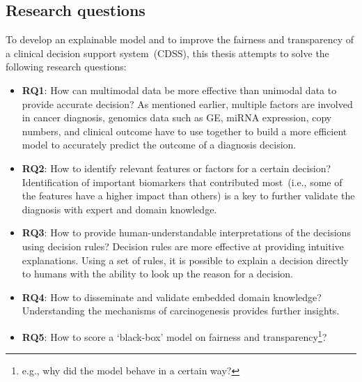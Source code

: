 \subsection{Research questions}
To develop an explainable model and to improve the fairness and transparency of a clinical decision support system~(CDSS), this thesis attempts to solve the following research questions: 

\vspace{-2mm}
\begin{itemize}[noitemsep]
    \item \textbf{RQ1}: How can multimodal data be more effective than unimodal data to provide accurate decision? As mentioned earlier, multiple factors are involved in cancer diagnosis, genomics data such as GE, miRNA expression, copy numbers, and clinical outcome have to use together to build a more efficient model to accurately predict the outcome of a diagnosis decision.  
    \item \textbf{RQ2}: How to identify relevant features or factors for a certain decision? Identification of important biomarkers that contributed most~(i.e., some of the features have a higher impact than others) is a key to further validate the diagnosis with expert and domain knowledge.  
    \item \textbf{RQ3}: How to provide human-understandable interpretations of the decisions using decision rules? Decision rules are more effective at providing intuitive explanations. Using a set of rules, it is possible to explain a decision directly to humans with the ability to look up the reason for a decision. 
    \item \textbf{RQ4}: How to disseminate and validate embedded domain knowledge? Understanding the  mechanisms of carcinogenesis provides further insights. 
    \item \textbf{RQ5}: How to score a `black-box' model on fairness and transparency\footnote{e.g., why did the model behave in a certain way?}? 
\end{itemize}
\vspace{-2mm}

